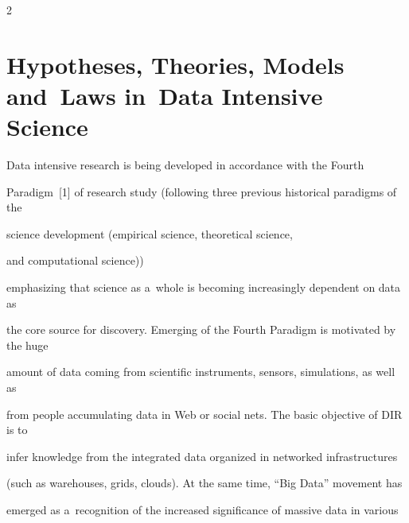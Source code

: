 












      \thispagestyle{myheadings}





      \begin{multicols}{2}





                  \label{st\stat}








\section{Hypotheses, Theories, Models and~Laws in~Data Intensive Science}





  \noindent


  Data intensive research is being developed in accordance with the Fourth


Paradigm~[1] of research study (following three previous historical paradigms of the


science development (empirical science, theoretical science,


and computational science))


emphasizing that science as a~whole is becoming increasingly dependent on data as


the core source for discovery. Emerging of the Fourth Paradigm is motivated by the huge


amount of data coming from scientific instruments, sensors, simulations, as well as


from people accumulating data in Web or social nets. The basic objective of DIR is to


infer knowledge from the integrated data organized in networked infrastructures


(such as warehouses, grids, clouds). At the same time, ``Big Data'' movement has


emerged as a~recognition of the increased significance of massive data in various



\end{multicols}
